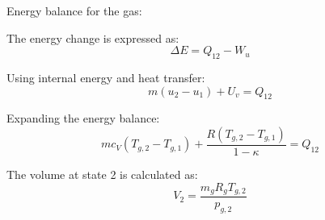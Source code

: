 Energy balance for the gas:  

The energy change is expressed as:  
\[
\Delta E = Q_{12} - W_u
\]  

Using internal energy and heat transfer:  
\[
m(u_2 - u_1) + U_v = Q_{12}
\]  

Expanding the energy balance:  
\[
m c_V (T_{g,2} - T_{g,1}) + \frac{R (T_{g,2} - T_{g,1})}{1 - \kappa} = Q_{12}
\]  

The volume at state 2 is calculated as:  
\[
V_2 = \frac{m_g R_g T_{g,2}}{p_{g,2}}
\]